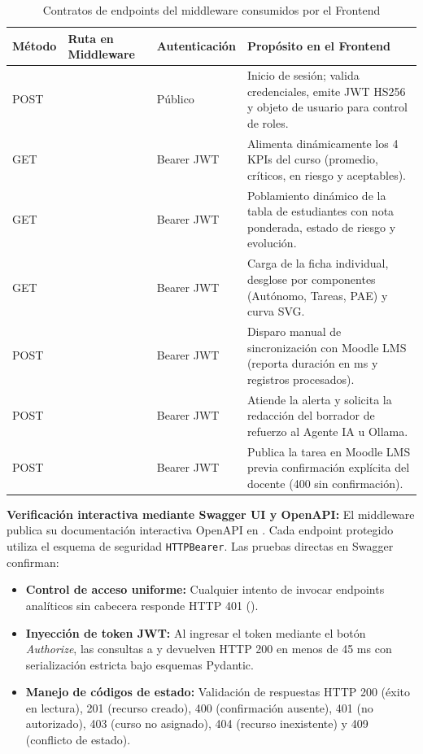 \documentclass[11pt,a4paper]{article}
\newcommand{\hd}[1]{\textbf{#1}}
\begin{document}
\begin{table}[H]
\centering\small
\caption{Contratos de endpoints del middleware consumidos por el Frontend}
\label{tab:contratos_api}
\begin{tabularx}{\textwidth}{|R{1.4cm}|R{4.6cm}|R{2.2cm}|Y|}
\hline
\hd{Método} & \hd{Ruta en Middleware} & \hd{Autenticación} & \hd{Propósito en el Frontend}\\ \hline
POST &  & Público & Inicio de sesión; valida credenciales, emite JWT HS256 y objeto de usuario para control de roles.\\ \hline
GET &  & Bearer JWT & Alimenta dinámicamente los 4 KPIs del curso (promedio, críticos, en riesgo y aceptables).\\ \hline
GET &  & Bearer JWT & Poblamiento dinámico de la tabla de estudiantes con nota ponderada, estado de riesgo y evolución.\\ \hline
GET &  & Bearer JWT & Carga de la ficha individual, desglose por componentes (Autónomo, Tareas, PAE) y curva SVG.\\ \hline
POST &  & Bearer JWT & Disparo manual de sincronización con Moodle LMS (reporta duración en ms y registros procesados).\\ \hline
POST &  & Bearer JWT & Atiende la alerta y solicita la redacción del borrador de refuerzo al Agente IA u Ollama.\\ \hline
POST &  & Bearer JWT & Publica la tarea en Moodle LMS previa confirmación explícita del docente (400 sin confirmación).\\ \hline
\end{tabularx}
\end{table}

\textbf{Verificación interactiva mediante Swagger UI y OpenAPI:}
El middleware publica su documentación interactiva OpenAPI en . Cada endpoint protegido utiliza el esquema de seguridad \texttt{HTTPBearer}. Las pruebas directas en Swagger confirman:
\begin{itemize}
  \item \textbf{Control de acceso uniforme:} Cualquier intento de invocar endpoints analíticos sin cabecera responde HTTP 401 ().
  \item \textbf{Inyección de token JWT:} Al ingresar el token mediante el botón \emph{Authorize}, las consultas a  y  devuelven HTTP 200 en menos de 45 ms con serialización estricta bajo esquemas Pydantic.
  \item \textbf{Manejo de códigos de estado:} Validación de respuestas HTTP 200 (éxito en lectura), 201 (recurso creado), 400 (confirmación ausente), 401 (no autorizado), 403 (curso no asignado), 404 (recurso inexistente) y 409 (conflicto de estado).
\end{itemize}
\end{document}
